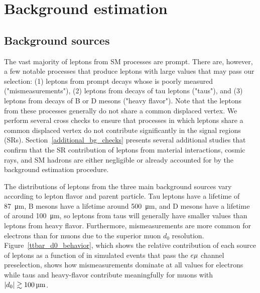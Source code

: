 \section{Background estimation}
\label{bg}
\subsection{Background sources}
\label{bg_sources}
The vast majority of leptons from SM processes are prompt. There are, however, a few notable processes that produce leptons with large \ad values that may pass our selection: (1) leptons from prompt decays whose \ad is poorly measured ("mismeasurements"), (2) leptons from  decays of tau leptons ("taus"), and (3) leptons from decays of B or D mesons ("heavy flavor"). Note that the leptons from these processes generally do not share a common displaced vertex. We perform several cross checks to ensure that processes in which leptons share a common displaced vertex do not contribute significantly in the signal regions (SRs). Section~\ref{additional_bg_checks} presents several additional studies that confirm that the SR contribution of leptons from material interactions, cosmic rays, and SM hadrons are either negligible or already accounted for by the background estimation procedure.

The \ad distributions of leptons from the three main background sources vary according to lepton flavor and parent particle. Tau leptons have a lifetime of \SI{87}{\um}, B mesons have a lifetime around \SI{500}{\um}, and D mesons have a lifetime of around \SI{100}{\um}, so leptons from taus will generally have smaller \ad values than leptons from heavy flavor. Furthermore, mismeasurements are more common for electrons than for muons due to the superior muon $d_0$ resolution. Figure~\ref{ttbar_d0_behavior}, which shows the relative contribution of each source of leptons as a function of \ad in simulated \ttbar events that pass the $e{\mu}$ channel preselection, shows how mismeasurements dominate at all \ad values for electrons while taus and heavy-flavor contribute meaningfully for muons with $\ad\gtrsim\SI{100}{\um}$.




